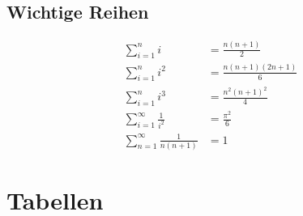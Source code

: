 \documentclass[a4paper,8pt]{extarticle}
\begin{document}
\subsection{Wichtige Reihen}
\begin{align*}
 \sum_{i=1}^n i &= \frac{n(n+1)}{2} \\
 \sum_{i=1}^n i^2 &= \frac{n(n+1)(2n+1)}{6} \\
 \sum_{i=1}^n i^3 &= \frac{n^2(n+1)^2}{4} \\
 \sum_{i=1}^\infty \frac{1}{i^2} &= \frac{\pi^2}{6} \\
 \sum_{n=1}^\infty \frac{1}{n(n+1)} &= 1
\end{align*}


\section{Tabellen}
\def\limxpi{\lim_{x\to +\infty}}
\def\limxmi{\lim_{x\to -\infty}}
\def\limxi{\lim_{x\to \pm \infty}}
\end{document}
